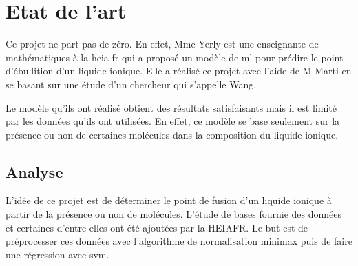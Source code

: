 \chapter{Etat de l'art}
\label{chap:stateoftheart}

Ce projet ne part pas de zéro.
En effet, Mme Yerly est une enseignante de mathématiques à la \acrshort{heia-fr} qui a proposé un modèle de \acrlong{ml} pour prédire le point d'ébullition d'un liquide ionique.
Elle a réalisé ce projet\cite{IL_SVM_report} avec l'aide de M Marti en se basant sur une étude d'un chercheur qui s'appelle Wang\cite{WANG2021432}.

Le modèle qu'ils ont réalisé obtient des résultats satisfaisants mais il est limité par les données qu'ils ont utilisées.
En effet, ce modèle se base seulement sur la présence ou non de certaines molécules dans la composition du liquide ionique.

\section{Analyse}
\label{sec:stateoftheart:analysis}
L'idée de ce projet est de déterminer le point de fusion d'un liquide ionique à partir de la présence ou non de molécules.
L'étude de bases\cite{WANG2021432} fournie des données et certaines d'entre elles ont été ajoutées par la HEIAFR.
Le but est de préprocesser ces données avec l'algorithme de normalisation \acrshort{minimax} puis de faire une régression avec \acrshort{svm}.

